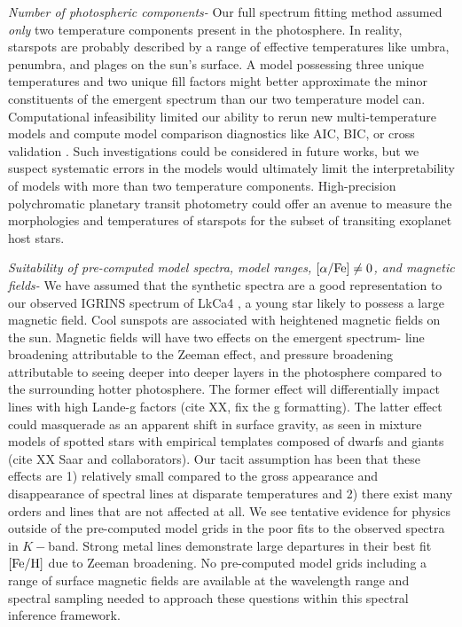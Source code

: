 \documentclass[twocolumn]{emulateapj}%
\newcommand{\name}{LkCa4 }
\begin{document}
\emph{Number of photospheric components-}  Our full spectrum fitting method assumed \emph{only} two temperature components present in the photosphere.  In reality, starspots are probably described by a range of effective temperatures like umbra, penumbra, and plages on the sun's surface.  A model possessing three unique temperatures and two unique fill factors might better approximate the minor constituents of the emergent spectrum than our two temperature model can.  Computational infeasibility limited our ability to rerun new multi-temperature models and compute model comparison diagnostics like AIC, BIC, or cross validation \citep{ivezic14}.  Such investigations could be considered in future works, but we suspect systematic errors in the models would ultimately limit the interpretability of models with more than two temperature components.  High-precision polychromatic planetary transit photometry could offer an avenue to measure the morphologies and temperatures of starspots for the subset of transiting exoplanet host stars.

\emph{Suitability of pre-computed \PHOENIX model spectra, model ranges, $[\alpha/{\rm Fe}] \neq 0$, and magnetic fields-} We have assumed that the \PHOENIX synthetic spectra are a good representation to our observed IGRINS spectrum of \name, a young star likely to possess a large magnetic field.  Cool sunspots are associated with heightened magnetic fields on the sun.  Magnetic fields will have two effects on the emergent spectrum- line broadening attributable to the Zeeman effect, and pressure broadening attributable to seeing deeper into deeper layers in the photosphere compared to the surrounding hotter photosphere.  The former effect will differentially impact lines with high Lande-g factors (cite XX, fix the g formatting).  The latter effect could masquerade as an apparent shift in surface gravity, as seen in mixture models of spotted stars with empirical templates composed of dwarfs and giants (cite XX Saar and collaborators).  Our tacit assumption has been that these effects are 1) relatively small compared to the gross appearance and disappearance of spectral lines at disparate temperatures and 2) there exist many orders and lines that are not affected at all.  We see tentative evidence for physics outside of the pre-computed model grids in the poor fits to the observed spectra in $K-$band.  Strong metal lines demonstrate large departures in their best fit $[{\rm Fe}/{\rm H}]$ due to Zeeman broadening.  No pre-computed model grids including a range of surface magnetic fields are available at the wavelength range and spectral sampling needed to approach these questions within this spectral inference framework.
\end{document}
